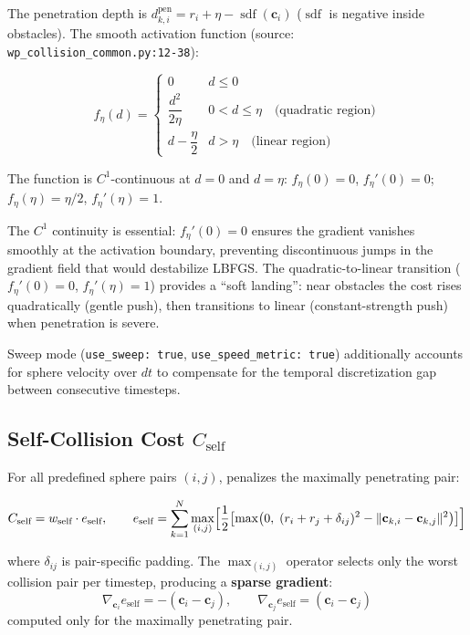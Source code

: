 \documentclass[11pt,a4paper]{article}
\begin{document}
The penetration depth is
$d_{k,i}^{\text{pen}} = r_i + \eta - \operatorname{sdf}(\mathbf{c}_i)$
($\operatorname{sdf}$ is negative inside obstacles).
The smooth activation function (source: \texttt{wp\_collision\_common.py:12-38}):

\begin{equation}
f_{\eta}(d) = \begin{cases}
0                        & d \le 0 \\[4pt]
\dfrac{d^2}{2\eta}       & 0 < d \le \eta \quad \text{(quadratic region)} \\[8pt]
d - \dfrac{\eta}{2}      & d > \eta \quad \text{(linear region)}
\end{cases}
\end{equation}

The function is $C^1$-continuous at $d = 0$ and $d = \eta$:
$f_{\eta}(0) = 0$, $f_{\eta}'(0) = 0$;
$f_{\eta}(\eta) = \eta/2$, $f_{\eta}'(\eta) = 1$.

The $C^1$ continuity is essential: $f_{\eta}'(0) = 0$ ensures the gradient vanishes
smoothly at the activation boundary, preventing discontinuous jumps in the gradient
field that would destabilize LBFGS. The quadratic-to-linear transition ($f_{\eta}'(0)=0$,
$f_{\eta}'(\eta)=1$) provides a ``soft landing'': near obstacles the cost rises quadratically
(gentle push), then transitions to linear (constant-strength push) when penetration is severe.

Sweep mode (\texttt{use\_sweep: true}, \texttt{use\_speed\_metric: true}) additionally
accounts for sphere velocity over $dt$ to compensate for the temporal discretization
gap between consecutive timesteps.

\subsection{Self-Collision Cost $C_{\text{self}}$}

For all predefined sphere pairs $(i,j)$, penalizes the maximally penetrating pair:

\begin{equation}
C_{\text{self}} = w_{\text{self}} \cdot e_{\text{self}}, \qquad
e_{\text{self}} = \sum_{k=1}^{N}
\max_{(i,j)} \Bigl[ \frac{1}{2} \bigl[ \max\bigl(0,\;
(r_i + r_j + \delta_{ij})^2 - \lVert\mathbf{c}_{k,i} - \mathbf{c}_{k,j}\rVert^2 \bigr) \bigr] \Bigr]
\label{eq:self}
\end{equation}

where $\delta_{ij}$ is pair-specific padding. The $\max_{(i,j)}$ operator selects only
the worst collision pair per timestep, producing a \textbf{sparse gradient}:
%
\begin{equation}
\nabla_{\mathbf{c}_i} e_{\text{self}} = -(\mathbf{c}_i - \mathbf{c}_j), \qquad
\nabla_{\mathbf{c}_j} e_{\text{self}} = (\mathbf{c}_i - \mathbf{c}_j)
\end{equation}
computed only for the maximally penetrating pair.
\end{document}

